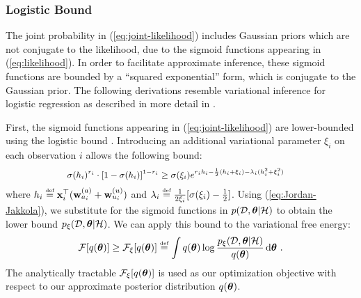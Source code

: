 \subsubsection{Logistic Bound}
The joint probability in (\ref{eq:joint-likelihood}) includes Gaussian priors which are not conjugate to the likelihood, due to the sigmoid functions appearing in (\ref{eq:likelihood}).
In order to facilitate approximate inference, these sigmoid functions are bounded by a ``squared exponential'' form, which is conjugate to the Gaussian prior. 
The following derivations resemble variational inference for logistic regression as described in more detail in \cite{LogisticBound}.

First, the sigmoid functions appearing in (\ref{eq:joint-likelihood}) are lower-bounded using the logistic bound \cite{VB_Methods}.
Introducing an additional variational parameter $\xi_i$ on each observation $i$ allows the following bound:
\begin{equation}
\begingroup\makeatletter\def\f@size{\fsize}\check@mathfonts
\def\maketag@@@#1{\hbox{\m@th\large\normalfont#1}}%
\begin{aligned}
& \sigma(h_i)^{r_i} \cdot \left[ 1- \sigma(h_i)\right]^{1-r_i} \geq  \sigma(\xi_i) e^{r_ih_i-\frac{1}{2}(h_i+\xi_i)-\lambda_i(h_i^2+\xi_i^2)}
\label{eq:Jordan-Jakkola}
\end{aligned}\endgroup
\end{equation} 
where $h_i \defined \x_i^\top ( \w^{(a)}_{a_i} + \w^{(u)}_{u_i} )$ and
$\lambda_i \defined \frac{1}{2 \xi_i} [ \sigma(\xi_i)-\frac{1}{2} ]$.
Using (\ref{eq:Jordan-Jakkola}), we substitute for the sigmoid functions in $p(\mathcal{D}, \bm{\theta} | \mathcal{H})$
to obtain the lower bound $p_{\xi}(\mathcal{D}, \bm{\theta} | \mathcal{H})$.
We can apply this bound to the variational free energy:
\[
\mathcal{F}[ q(\btheta)] \geq \mathcal{F}_{\xi}[ q(\btheta)] \defined  \int q(\btheta) \log \frac{p_{\xi}(\mathcal{D}, \btheta  | \mathcal{H})}{q(\btheta)} \, \mathrm{d} \btheta \ .
\]
The analytically tractable $\mathcal{F}_{\xi}[ q(\bm{\theta})]$ is used as our optimization objective with respect to our approximate posterior distribution $q(\bm{\theta})$. 

\newpage
